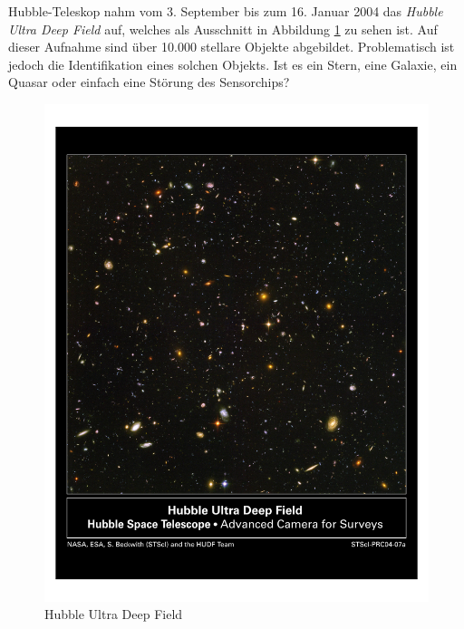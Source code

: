 \documentclass[12pt,journal,compsoc]{IEEEtran}
\begin{document}
% 
% 
% 
% 
 Hubble-Teleskop nahm vom 3. September bis zum 16. Januar
2004 das \emph{Hubble Ultra Deep Field} auf, welches als Ausschnitt in Abbildung \ref{fig:hs-2004-07-a-pdf} zu sehen ist. Auf dieser Aufnahme sind über 10.000 stellare Objekte abgebildet.
Problematisch ist jedoch die Identifikation eines solchen Objekts. Ist es ein Stern, eine Galaxie,
ein Quasar oder einfach eine Störung des Sensorchips?

\begin{figure}[!t]
\centering
\includegraphics[scale=0.45,trim={40 400 40 80},clip]{../beamer/hs-2004-07-a-pdf}
\caption{Hubble Ultra Deep Field \cite{HUDF}}
\label{fig:hs-2004-07-a-pdf}
\end{figure}
\end{document}
